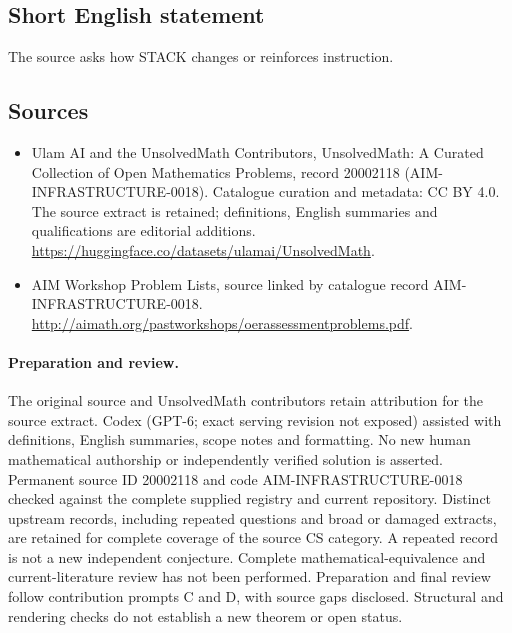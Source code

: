 \documentclass[11pt]{article}
\begin{document}
\subsection{Short English statement}
The source asks how STACK changes or reinforces instruction.
\subsection{Sources}
\begin{itemize}
\item[\hypertarget{source:20002118:1}{S1}] Ulam AI and the UnsolvedMath Contributors, UnsolvedMath: A Curated Collection of Open Mathematics Problems, record 20002118 (AIM-INFRASTRUCTURE-0018). Catalogue curation and metadata: CC BY 4.0. The source extract is retained; definitions, English summaries and qualifications are editorial additions.
\url{https://huggingface.co/datasets/ulamai/UnsolvedMath}.
\item[\hypertarget{source:20002118:2}{S2}] AIM Workshop Problem Lists, source linked by catalogue record AIM-INFRASTRUCTURE-0018.
\url{http://aimath.org/pastworkshops/oerassessmentproblems.pdf}.
\end{itemize}
\paragraph{Preparation and review.}
The original source and UnsolvedMath contributors retain attribution for the source extract. Codex (GPT-6; exact serving revision not exposed) assisted with definitions, English summaries, scope notes and formatting. No new human mathematical authorship or independently verified solution is asserted. Permanent source ID 20002118 and code AIM-INFRASTRUCTURE-0018 checked against the complete supplied registry and current repository. Distinct upstream records, including repeated questions and broad or damaged extracts, are retained for complete coverage of the source CS category. A repeated record is not a new independent conjecture. Complete mathematical-equivalence and current-literature review has not been performed. Preparation and final review follow contribution prompts C and D, with source gaps disclosed. Structural and rendering checks do not establish a new theorem or open status.
\label{end:20002118}
\end{document}
